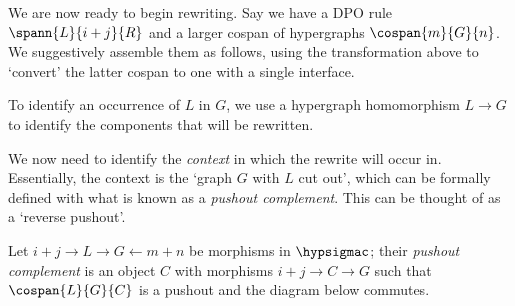 We are now ready to begin rewriting.
Say we have a DPO rule \(\spann{L}{i + j}{R}\) and a larger cospan of
hypergraphs \(\cospan{m}{G}{n}\).
We suggestively assemble them as follows, using the transformation above to
`convert' the latter cospan to one with a single interface.

\begin{center}
\end{center}

To identify an occurrence of \(L\) in \(G\), we use a
hypergraph homomorphism \(L \to G\) to identify the components that will be
rewritten.

\begin{center}
\end{center}

We now need to identify the \emph{context} in which the rewrite will occur in.
Essentially, the context is the `graph \(G\) with \(L\) cut out', which can be
formally defined with what is known as a \emph{pushout complement}.
This can be thought of as a `reverse pushout'.

\begin{definition}\label{def:pushout-complement}
    Let \(i+j \to L \to G \leftarrow m+n\) be morphisms in
    \(\hypsigmac\); their \emph{pushout complement} is an object \(C\)
    with morphisms \(i+j \to C \to G\) such that \(\cospan{L}{G}{C}\) is a
    pushout and the diagram below commutes.
    \begin{center}
    \end{center}
\end{definition}

